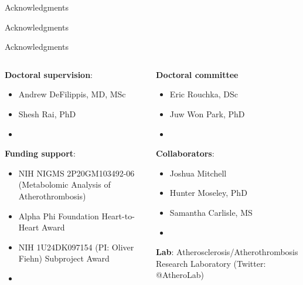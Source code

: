 \documentclass[xcolor=dvipsnames]{beamer}
\begin{document}
\begin{frame}{Acknowledgments}
	\vspace{-5.5pt}
	\begin{center}
	\end{center}
\end{frame}

\begin{frame}{Acknowledgments}
	\vspace{-15.5pt}
	\begin{center}
	\end{center}
\end{frame}

\begin{frame}{Acknowledgments}
	\begin{columns}
		\begin{column}{0.5\textwidth}
			\textbf{Doctoral supervision}:
			\begin{itemize}
				\item Andrew DeFilippis, MD, MSc
				\item Shesh Rai, PhD
				\item[]
			\end{itemize}
			\textbf{Funding support}:
			\begin{itemize}
				\item NIH NIGMS 2P20GM103492-06 (Metabolomic Analysis of Atherothrombosis)
				\item Alpha Phi Foundation Heart-to-Heart Award
				\item NIH 1U24DK097154 (PI: Oliver Fiehn) Subproject Award
				\item[]
			\end{itemize}
		\end{column}
		\vspace{-25.5pt}
		\begin{column}{0.5\textwidth}
			\textbf{Doctoral committee }
			\begin{itemize}
				\item Eric Rouchka, DSc
				\item Juw Won Park, PhD
				\item[]
			\end{itemize}
			\textbf{Collaborators}:
			\begin{itemize}
				\item Joshua Mitchell 
				\item Hunter Moseley, PhD
				\item Samantha Carlisle, MS
				\item[]
			\end{itemize}
			\textbf{Lab}: Atherosclerosis/Atherothrombosis Research Laboratory (Twitter: @AtheroLab)
		\end{column}
	\end{columns}
\end{frame}
\end{document}
